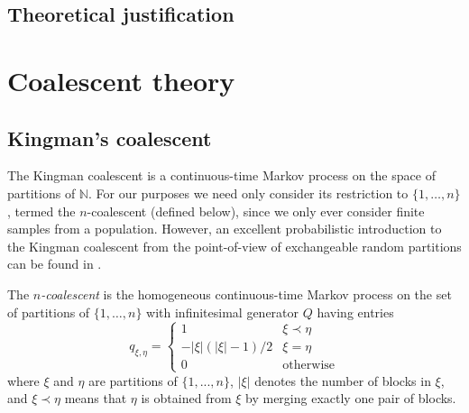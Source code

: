 \subsection{Theoretical justification}


\section{Coalescent theory \seb{$\checkmark$} }

\subsection{Kingman's coalescent \seb{$\checkmark$} }
The Kingman coalescent \parencite{kingman1982gene, kingman1982coal, kingman1982exch} is a continuous-time Markov process on the space of partitions of $\mathbb{N}$. For our purposes we need only consider its restriction to $\{1,\dots,n\}$, termed the $n$-coalescent (defined below), since we only ever consider finite samples from a population. 
However, an excellent probabilistic introduction to the Kingman coalescent from the point-of-view of exchangeable random partitions can be found in \textcite[Chapters 1--2]{berestycki2009}. 
\begin{defn}
\label{def:kingman}
The \emph{$n$-coalescent} is the homogeneous continuous-time Markov process on the set of partitions of $\{1,\dots,n\}$ with infinitesimal generator $Q$ having entries
\begin{equation}\label{eq:KCgenerator}
q_{\xi,\eta} = \begin{cases}
1 & \xi \prec \eta\\
-|\xi|(|\xi|-1)/2 & \xi=\eta \\
0 & \text{otherwise}
\end{cases}
\end{equation}
where $\xi$ and $\eta$ are partitions of $\{1,...,n\}$, $|\xi|$ denotes the number of blocks in $\xi$, and $\xi \prec \eta$ means that $\eta$ is obtained from $\xi$ by merging exactly one pair of blocks.
\end{defn}

